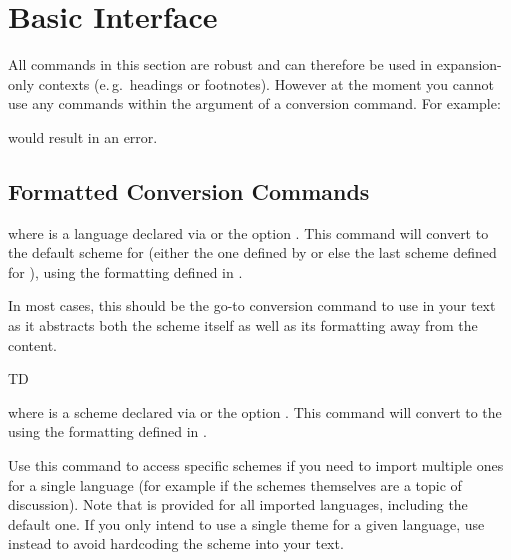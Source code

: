 \documentclass{ltxdockit}
\begin{document}
\section{Basic Interface}

All commands in this section are robust and can therefore be used in
expansion-only contexts (e.\,g.\ headings or footnotes). However at the moment
you cannot use any commands within the argument of a conversion command. For
example:

\begin{ltxcode}
\end{ltxcode}

\noindent
would result in an error.

\subsection{Formatted Conversion Commands}

\begin{ltxsyntax}

  where  is a language declared via
   or the option . This
  command will convert  to the default scheme for  (either
  the one defined by  or else the last scheme defined for
  ), using the formatting defined in .

  In most cases, this should be the go-to conversion command to use in your text
  as it abstracts both the scheme itself as well as its formatting away from the
  content.

  TD


  where  is a scheme declared via
   or the option . This
  command will convert  to the  using the formatting
  defined in .

  Use this command to access specific schemes if you need to import multiple
  ones for a single language (for example if the schemes themselves are a topic
  of discussion). Note that  is provided for all
  imported languages, including the default one. If you only intend to use a
  single theme for a given language, use  instead to
  avoid hardcoding the scheme into your text.

\end{ltxsyntax}
\end{document}
